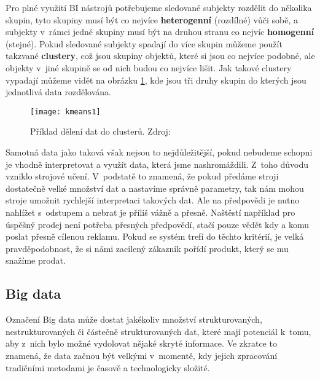 \par Pro plné využití BI nástrojů potřebujeme sledované subjekty rozdělit do několika skupin, tyto skupiny musí být co nejvíce \textbf{heterogenní} (rozdílné) vůči sobě, a subjekty v~rámci jedné skupiny musí být na druhou stranu co nejvíc \textbf{homogenní} (stejné). Pokud sledované subjekty spadají do více skupin můžeme použít takzvané \textbf{clustery}, což jsou skupiny objektů, které si jsou co nejvíce podobné, ale objekty v~jiné skupině se od nich budou co nejvíce lišit. \cite{data-science-business} Jak takové clustery vypadají můžeme vidět na obrázku \ref{cluster-fig}, kde jsou tři druhy skupin do kterých jsou jednotlivá data rozdělována.

\begin{figure}[htp]
\centering
\texttt{[image: kmeans1]}
\caption[Příklad dělení dat do clusterů]{Příklad dělení dat do clusterů. Zdroj: \cite{data-science-business}}
\label{cluster-fig}
\end{figure}

\par Samotná data jako taková však nejsou to nejdůležitější, pokud nebudeme schopni je vhodně interpretovat a využít data, která jsme nashromáždili. Z~toho důvodu vzniklo strojové učení. V~podstatě to znamená, že pokud předáme stroji dostatečně velké množství dat a nastavíme správně parametry, tak nám mohou stroje umožnit rychlejší interpretaci takových dat. Ale na předpovědi je nutno nahlížet s~odstupem a nebrat je příliš vážně a přesně. Naštěstí například pro úspěšný prodej není potřeba přesných předpovědí, stačí pouze vědět kdy a komu poslat přesně cílenou reklamu. Pokud se systém trefí do těchto kritérií, je velká pravděpodobnost, že si námi zacílený zákazník pořídí produkt, který se mu snažíme prodat. \cite{predictive-analytics}

\subsection{Big data} \label{big-data}
\par Označení Big data může dostat jakékoliv množství strukturovaných, nestrukturovaných či částečně strukturovaných dat, které mají potenciál k~tomu, aby z~nich bylo možné vydolovat nějaké skryté informace. Ve zkratce to znamená, že data začnou být velkými v~momentě, kdy jejich zpracování tradičními metodami je časově a technologicky složité.\cite{big-data-anayitics}


